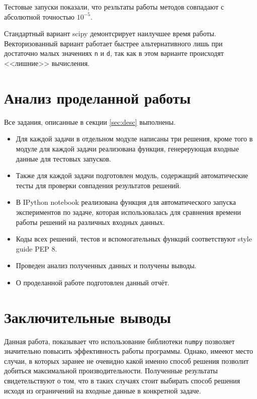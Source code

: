 \documentclass{article}
\begin{document}
Тестовые запуски показали, что резльтаты работы методов совпадают с абсолютной точностью $10^{-5}$.

\analysis

Стандартный вариант scipy демонтсрирует наилучшее время работы. 
Векторизованный вариант работает быстрее альтернативного лишь при достаточно малых
значениях \verb"n" и \verb"d", так как в этом варианте происходят
<<лишние>>   вычисления.

\section{Анализ проделанной работы}

Все задания, описанные в секции \ref{sec:desc} выполнены. 

\begin{itemize}
    \item 
    Для каждой задачи в отдельном модуле написаны три решения, кроме того в модуле для каждой
    задачи реализована функция, генерерующая входные данные для тестовых запусков.
    \item 
    Также для каждой задачи подготовлен модуль, содержащий автоматические тесты для 
    проверки совпадения результатов решений.
    \item 
    В IPython notebook реализована функция для автоматического запуска экспериментов по
    задаче, которая использовалась для сравнения времени работы решений на различных входных
    данных.
    \item
    Коды всех решений, тестов и вспомогательных функций соответствуют style guide PEP 8.
    \item
    Проведен анализ полученных данных и получены выводы.
    \item
    О проделанной работе подготовлен данный отчёт.
\end{itemize}

\section{Заключительные выводы}

Данная работа, показывает что использование библиотеки \verb"numpy" позволяет
значительно повысить эффективность работы программы. Однако, имееют место случаи, в которых
заранее не очевидно какой именно способ решения позволит добиться максимальной производительности.
Полученные результаты свидетельствуют о том, что в таких случаях стоит выбирать способ решения исходя из
ограничений на входные данные в конкретной задаче.
\end{document}
